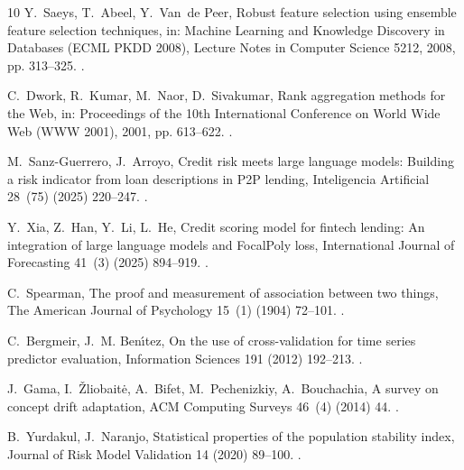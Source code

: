 \documentclass[final,5p,twocolumn]{elsarticle}
\begin{document}
\begin{thebibliography}{10}
Y.~Saeys, T.~Abeel, Y.~Van~de Peer, Robust feature selection using ensemble
  feature selection techniques, in: Machine Learning and Knowledge Discovery in
  Databases (ECML PKDD 2008), Lecture Notes in Computer Science 5212, 2008, pp.
  313--325.
\newblock \href {https://doi.org/10.1007/978-3-540-87481-2_21}
  {}.

C.~Dwork, R.~Kumar, M.~Naor, D.~Sivakumar, Rank aggregation methods for the
  {W}eb, in: Proceedings of the 10th International Conference on World Wide Web
  (WWW 2001), 2001, pp. 613--622.
\newblock \href {https://doi.org/10.1145/371920.372165}
  {}.

M.~Sanz-Guerrero, J.~Arroyo, Credit risk meets large language models: Building
  a risk indicator from loan descriptions in {P2P} lending, Inteligencia
  Artificial 28~(75) (2025) 220--247.
\newblock \href {https://doi.org/10.4114/intartif.vol28iss75pp220-247}
  {}.

Y.~Xia, Z.~Han, Y.~Li, L.~He, Credit scoring model for fintech lending: An
  integration of large language models and {FocalPoly} loss, International
  Journal of Forecasting 41~(3) (2025) 894--919.
\newblock \href {https://doi.org/10.1016/j.ijforecast.2024.07.005}
  {}.

C.~Spearman, The proof and measurement of association between two things, The
  American Journal of Psychology 15~(1) (1904) 72--101.
\newblock \href {https://doi.org/10.2307/1412159} {}.

C.~Bergmeir, J.~M. Ben{\'\i}tez, On the use of cross-validation for time series
  predictor evaluation, Information Sciences 191 (2012) 192--213.
\newblock \href {https://doi.org/10.1016/j.ins.2011.12.028}
  {}.

J.~Gama, I.~{\v{Z}}liobait{\.e}, A.~Bifet, M.~Pechenizkiy, A.~Bouchachia, A
  survey on concept drift adaptation, ACM Computing Surveys 46~(4) (2014) 44.
\newblock \href {https://doi.org/10.1145/2523813} {}.

B.~Yurdakul, J.~Naranjo, Statistical properties of the population stability
  index, Journal of Risk Model Validation 14 (2020) 89--100.
\newblock \href {https://doi.org/10.21314/JRMV.2020.227}
  {}.


\end{thebibliography}
\end{document}
